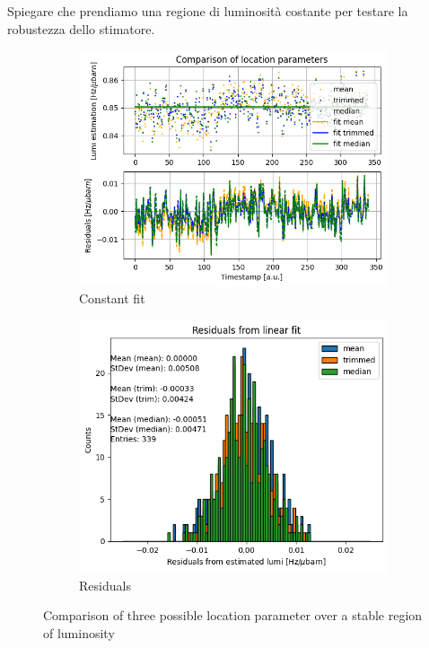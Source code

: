 Spiegare che prendiamo una regione di luminosità costante per testare la robustezza dello stimatore. 

\begin{figure}
    \centering
    \begin{subfigure}{0.48\textwidth}
    \includegraphics[width=\linewidth]{figures/fit_wo_outliers.png}
    \caption{Constant fit}\label{fig:costant_fit_location}
    \end{subfigure}
    \begin{subfigure}{0.48\textwidth}
    \includegraphics[width=\linewidth]{figures/resiudals_without_outliers.png}
    \caption{Residuals}\label{fig:res_location}
    \end{subfigure}
    \caption{Comparison of three possible location parameter over a stable region of luminosity}
    \label{fig:lumi_fit_location_param}
\end{figure}


